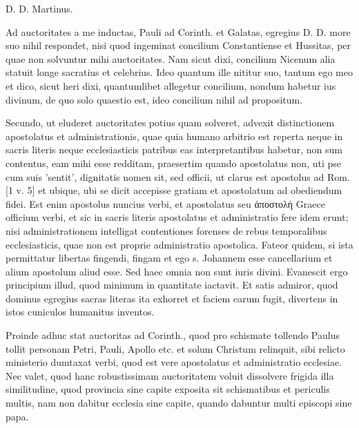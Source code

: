 D. D. Martinus.

Ad auctoritates a me inductas, Pauli ad Corinth. et Galatas, egregius D. D. more suo nihil respondet, nisi quod ingeminat concilium Constantiense et Hussitas, per quae non solvuntur mihi auctoritates. Nam sicut dixi, concilium Nicenum alia statuit longe sacratius et celebrius. Ideo quantum ille nititur suo, tantum ego meo et dico, sicut heri dixi, quantumlibet allegetur concilium, nondum habetur ius divinum, de quo solo quaestio est, ideo concilium nihil ad propositum.

Secundo, ut eluderet auctoritates potius quam solveret, advexit distinctionem apostolatus et administrationis, quae quia humano arbitrio est reperta neque in sacris literis neque ecclesiasticis patribus eas interpretantibus habetur, non sum contentus, eam mihi esse redditam, praesertim quando apostolatus non, uti pse cum suis 'sentit', dignitatis nomen sit, sed officii, ut clarus est apostolus ad Rom. [1 v. 5] et ubique, ubi se dicit accepisse gratiam et apostolatum ad obediendum fidei. Est enim apostolus nuncius verbi, et apostolatus seu ἀποστολή Graece officium verbi, et sic in sacris literis apostolatus et administratio fere idem erunt; nisi administrationem intelligat contentiones forenses de rebus temporalibus ecclesiasticis, quae non est proprie administratio apostolica. Fateor quidem, si ista permittatur libertas fingendi, fingam et ego s. Johannem esse cancellarium et alium apostolum aliud esse. Sed haec omnia non sunt iuris divini. Evanescit ergo principium illud, quod minimum in quantitate iactavit. Et satis admiror, quod dominus egregius sacras literas ita exhorret et faciem earum fugit, divertens in istos cuniculos humanitus inventos.

Proinde adhuc stat auctoritas ad Corinth., quod pro schismate tollendo Paulus tollit personam Petri, Pauli, Apollo etc. et solum Christum relinquit, sibi relicto ministerio dumtaxat verbi, quod est vere apostolatus et administratio ecclesiae. Nec valet, quod hanc robustissimam auctoritatem voluit dissolvere frigida illa similitudine, quod provincia sine capite exposita sit schismatibus et periculis multis, nam non dabitur ecclesia sine capite, quando dabuntur multi episcopi sine papa.

